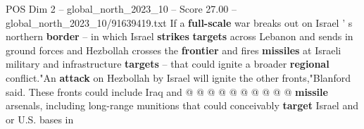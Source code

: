 \begin{textsample}{POS Dim 2 – global\_north\_2023\_10 – Score 27.00 – global\_north\_2023\_10/91639419.txt}
If a \textbf{full-scale} war breaks out on Israel ' s northern \textbf{border} -- in which Israel \textbf{strikes} \textbf{targets} across Lebanon and sends in ground forces and Hezbollah crosses the \textbf{frontier} and fires \textbf{missiles} at Israeli military and infrastructure \textbf{targets} -- that could ignite a broader \textbf{regional} conflict."An \textbf{attack} on Hezbollah by Israel will ignite the other fronts,"Blanford said.
These fronts could include Iraq and @ @ @ @ @ @ @ @ @ @ \textbf{missile} arsenals, including long-range munitions that could conceivably \textbf{target} Israel and or U.S. bases in

\end{textsample}

